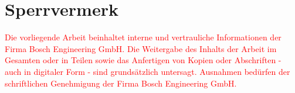 \section*{Sperrvermerk}
\textcolor{red}{
Die vorliegende Arbeit beinhaltet interne und vertrauliche Informationen der Firma Bosch Engineering GmbH.
Die Weitergabe des Inhalts der Arbeit im Gesamten oder in Teilen sowie das Anfertigen
von Kopien oder Abschriften - auch in digitaler Form - sind grundsätzlich untersagt.
Ausnahmen bedürfen der schriftlichen Genehmigung der Firma Bosch Engineering GmbH.
}

\newpage
